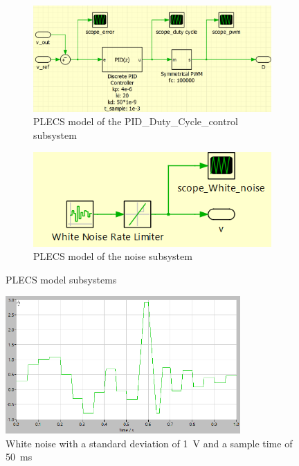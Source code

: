 \begin{figure}[htbp]
    \centering
    \begin{subfigure}[b]{0.55\textwidth}
        \centering
        \includegraphics[width=\textwidth]{img/PLECS_PID_Duty_Cycle_control.png}
        \caption{PLECS model of the PID\_Duty\_Cycle\_control subsystem}
        \label{fig:PLECS_PID}
    \end{subfigure}
    \hfill
    \begin{subfigure}[b]{0.40\textwidth}
        \centering
        \includegraphics[width=\textwidth]{img/PLECS_noise.png}
        \caption{PLECS model of the noise subsystem}
        \label{fig:PLECS_noise}
    \end{subfigure}
    \caption{PLECS model subsystems}
    \label{fig:PLECS_subsystems}
\end{figure}

\begin{figure}[htbp]
    \centering
    \includegraphics[width=0.8\textwidth]{img/noise.png}
    \caption{White noise with a standard deviation of \qty{1}{\volt} and a sample time of \qty{50}{\milli\second}}
    \label{fig:noise}
\end{figure}


